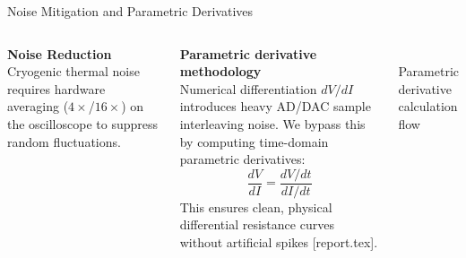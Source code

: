 \documentclass[aspectratio=169]{beamer}
\begin{document}
\begin{frame}{Noise Mitigation and Parametric Derivatives}
    \begin{columns}
        \textbf{Noise Reduction} \\
        Cryogenic thermal noise requires hardware averaging ($4\times$/$16\times$) on the oscilloscope to suppress random fluctuations.
        
        \vspace{0.2cm}
        \textbf{Parametric derivative methodology} \\
        Numerical differentiation $dV/dI$ introduces heavy AD/DAC sample interleaving noise. We bypass this by computing time-domain parametric derivatives:
        \begin{equation}
            \frac{dV}{dI} = \frac{dV/dt}{dI/dt}
        \end{equation}
        This ensures clean, physical differential resistance curves without artificial spikes [report.tex].

        \centering
         \\
        \vspace{0.1cm}
        \scriptsize Parametric derivative calculation flow
    \end{columns}
\end{frame}

\end{document}
